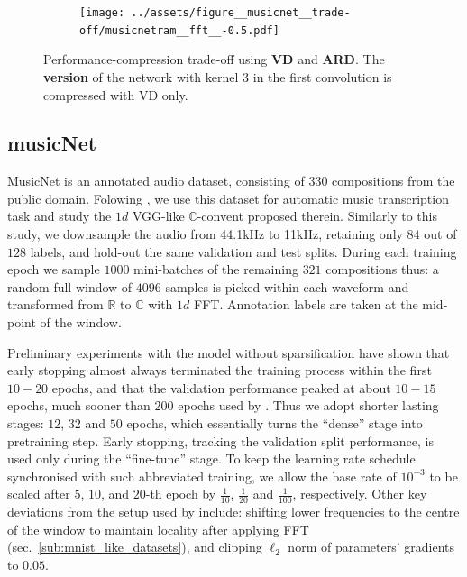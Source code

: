 \documentclass[a4paper,10pt]{article}
\newcommand{\real}{\mathbb{R}}
\newcommand{\cplx}{\mathbb{C}}
\begin{document}
\begin{figure}[!h]
  \centering
  \begin{subfigure}[b]{1.\textwidth}  %
    \centering
    \texttt{[image: ../assets/figure\_\_musicnet\_\_trade-off/musicnetram\_\_fft\_\_-0.5.pdf]}
  \end{subfigure}
  \caption{%
    Performance-compression trade-off using \textbf{\color{blue} VD} and \textbf{\color{orange} ARD}.
    The \textbf{\color{pink} version} of the network with kernel $3$ in the first convolution is
    compressed with VD only.
  }
  \label{fig:musicnet__trade-off}
\end{figure}



\subsection{musicNet} %
\label{sub:musicnet}

MusicNet \citep{thickstun_learning_2017} is an annotated audio dataset, consisting of $330$
compositions from the public domain. Folowing \citet{trabelsi_deep_2017}, we use this
dataset for automatic music transcription task and study the $1d$ VGG-like $\cplx$-convent
proposed therein. Similarly to this study, we downsample the audio from 44.1kHz to 11kHz,
retaining only $84$ out of $128$ labels, and hold-out the same validation and test splits.
During each training epoch we sample $1000$ mini-batches of the remaining $321$ compositions
thus: a random full window of $4096$ samples is picked within each waveform and transformed
from $\real$ to $\cplx$ with $1d$ FFT. Annotation labels are taken at the mid-point of the
window.

Preliminary experiments with the model without sparsification have shown that early stopping
almost always terminated the training process within the first $10-20$ epochs, and that the
validation performance peaked at about $10-15$ epochs, much sooner than $200$ epochs used by
\citet{trabelsi_deep_2017}. Thus we adopt shorter lasting stages: $12$, $32$ and $50$ epochs,
which essentially turns the ``dense'' stage into pretraining step. Early stopping, tracking
the validation split performance, is used only during the ``fine-tune'' stage. To keep the
learning rate schedule synchronised with such abbreviated training, we allow the base rate
of $10^{-3}$ to be scaled after $5$, $10$, and $20$-th epoch by $\tfrac1{10}$, $\tfrac1{20}$
and $\tfrac1{100}$, respectively. Other key deviations from the setup used by \citet{trabelsi_deep_2017}
include: shifting lower frequencies to the centre of the window to maintain locality after
applying FFT (sec.~\ref{sub:mnist_like_datasets}), and clipping $\ell_2$ norm of parameters'
gradients to $0.05$.
\end{document}
